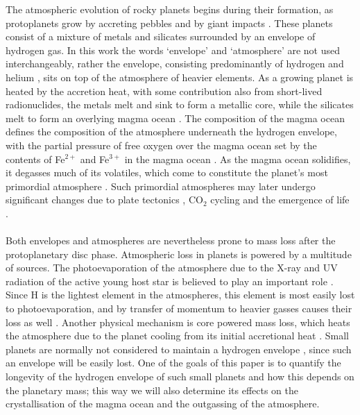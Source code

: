 \documentclass[bibyear,tradiabstract]{aa}
\begin{document}
The atmospheric evolution of rocky planets begins during their formation, as protoplanets grow by accreting pebbles \citep{Johansen+2015,Johansen+2021,Broz+2021,Olson+2021,Johansen+2023I} and by giant impacts \citep{Wetherill1990,Chambers&Wetherill1998,Woo+2022,Batygin&Morbidelli2023}. These planets consist of a mixture of metals and silicates surrounded by an envelope of hydrogen gas. In this work the words `envelope' and `atmosphere' are not used interchangeably, rather the envelope, consisting predominantly of hydrogen and helium \citep{Piso+Youdin2014}, sits on top of the atmosphere of heavier elements. As a growing planet is heated by the accretion heat, with some contribution also from short-lived radionuclides, the metals melt and sink to form a metallic core, while the silicates melt to form an overlying magma ocean \citep{Tronnes+2019}. The composition of the magma ocean defines the composition of the atmosphere underneath the hydrogen envelope, with the partial pressure of free oxygen over the magma ocean set by the contents of Fe$^{2+}$ and Fe$^{3+}$ in the magma ocean \citep{Armstrong+2019,Ortenzi+2020,Deng+2020}. As the magma ocean solidifies, it degasses much of its volatiles, which come to constitute the planet's most primordial atmosphere \citep{Elkins-Tanton2008,Deng+2020}. Such primordial atmospheres may later undergo significant changes due to plate tectonics \citep{Korenaga2013,Lammer+2018}, CO$_2$ cycling \citep{Berner2004,Tranvik+2009} and the emergence of life \citep{Lyons+2014,Krissansen-Totton+2018}.\\
\\
\noindent Both envelopes and atmospheres are nevertheless prone to mass loss after the protoplanetary disc phase. Atmospheric loss in planets is powered by a multitude of sources. The photoevaporation of the atmosphere due to the X-ray and UV radiation of the active young host star is believed to play an important role \citep{Owen&Wu2013,Erkaev+2014,Johnstone+2021}. Since H is the lightest element in the atmospheres, this element is most easily lost to photoevaporation, and by transfer of momentum to heavier gasses causes their loss as well \citep{Erkaev+2014}. Another physical mechanism is core powered mass loss, which heats the atmosphere due to the planet cooling from its initial accretional heat \citep{Gupta&Schlichting2019}. Small planets are normally not considered to maintain a hydrogen envelope \citep{Liggins+2022,Seligman+2022}, since such an envelope will be easily lost. One of the goals of this paper is to quantify the longevity of the hydrogen envelope of such small planets and how this depends on the planetary mass; this way we will also determine its effects on the crystallisation of the magma ocean and the outgassing of the atmosphere. 
\end{document}
